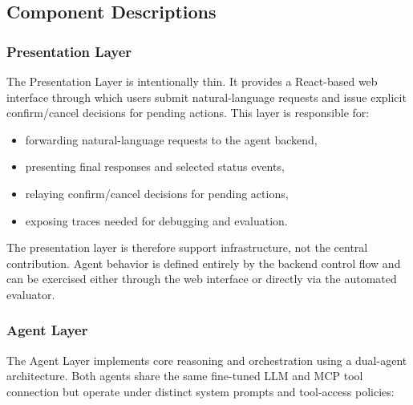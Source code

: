 \subsection{Component Descriptions}

\subsubsection{Presentation Layer}

The Presentation Layer is intentionally thin. It provides a React-based web interface through which users submit natural-language requests and issue explicit confirm/cancel decisions for pending actions. This layer is responsible for:

\begin{itemize}
    \item forwarding natural-language requests to the agent backend,
    \item presenting final responses and selected status events,
    \item relaying confirm/cancel decisions for pending actions,
    \item exposing traces needed for debugging and evaluation.
\end{itemize}

The presentation layer is therefore support infrastructure, not the central contribution. Agent behavior is defined entirely by the backend control flow and can be exercised either through the web interface or directly via the automated evaluator.

\subsubsection{Agent Layer}

The Agent Layer implements core reasoning and orchestration using a dual-agent architecture. Both agents share the same fine-tuned LLM and MCP tool connection but operate under distinct system prompts and tool-access policies:

